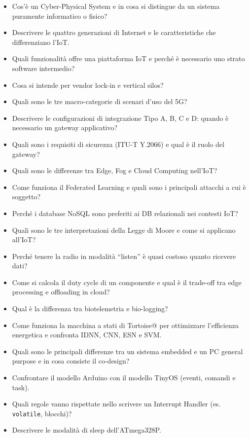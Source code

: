 \documentclass[
  italian,
  openany]{book}
\providecommand{\tightlist}{%
  \setlength{\itemsep}{0pt}\setlength{\parskip}{0pt}}
\begin{document}
\begin{itemize}
\tightlist
\item
  Cos'è un Cyber-Physical System e in cosa si distingue da un sistema
  puramente informatico o fisico?
\item
  Descrivere le quattro generazioni di Internet e le caratteristiche che
  differenziano l'IoT.
\item
  Quali funzionalità offre una piattaforma IoT e perché è necessario uno
  strato software intermedio?
\item
  Cosa si intende per vendor lock-in e vertical silos?
\item
  Quali sono le tre macro-categorie di scenari d'uso del 5G?
\item
  Descrivere le configurazioni di integrazione Tipo A, B, C e D: quando
  è necessario un gateway applicativo?
\item
  Quali sono i requisiti di sicurezza (ITU-T Y.2066) e qual è il ruolo
  del gateway?
\item
  Quali sono le differenze tra Edge, Fog e Cloud Computing nell'IoT?
\item
  Come funziona il Federated Learning e quali sono i principali attacchi
  a cui è soggetto?
\item
  Perché i database NoSQL sono preferiti ai DB relazionali nei contesti
  IoT?
\item
  Quali sono le tre interpretazioni della Legge di Moore e come si
  applicano all'IoT?
\item
  Perché tenere la radio in modalità ``listen'' è quasi costoso quanto
  ricevere dati?
\item
  Come si calcola il duty cycle di un componente e qual è il trade-off
  tra edge processing e offloading in cloud?
\item
  Qual è la differenza tra biotelemetria e bio-logging?
\item
  Come funziona la macchina a stati di Tortoise@ per ottimizzare
  l'efficienza energetica e confronta IDNN, CNN, ESN e SVM.
\item
  Quali sono le principali differenze tra un sistema embedded e un PC
  general purpose e in cosa consiste il co-design?
\item
  Confrontare il modello Arduino con il modello TinyOS (eventi, comandi
  e task).
\item
  Quali regole vanno rispettate nello scrivere un Interrupt Handler (es.
  \texttt{volatile}, blocchi)?
\item
  Descrivere le modalità di sleep dell'ATmega328P.
\end{itemize}
\end{document}
